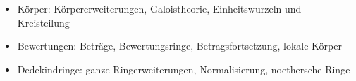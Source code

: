 \begin{course}
\begin{content}
\begin{itemize}\item Körper: \newline
Körpererweiterungen, Galoistheorie, Einheitswurzeln und Kreisteilung  \item Bewertungen: \newline
Beträge, Bewertungsringe, Betragsfortsetzung, lokale Körper  \item Dedekindringe: \newline
ganze Ringerweiterungen, Normalisierung, noethersche Ringe  \end{itemize}
\end{content}







\end{course}